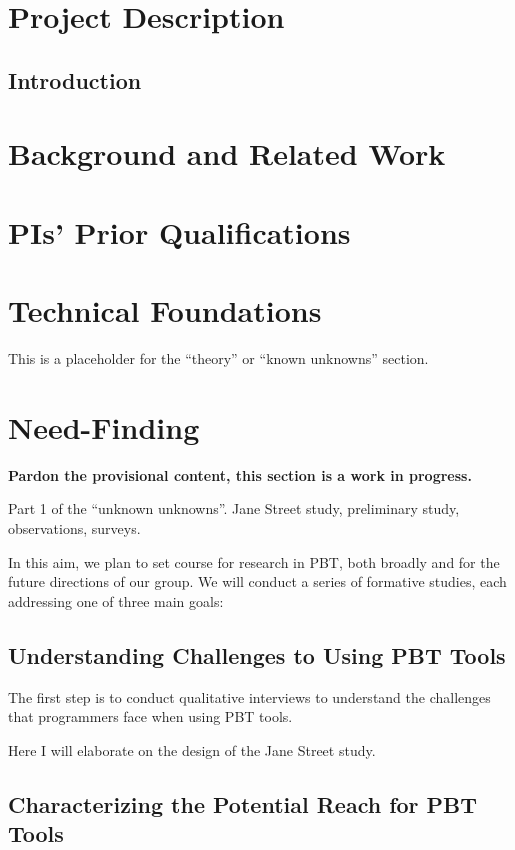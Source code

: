 \section{Project Description}
\subsection{Introduction}

\section{Background and Related Work}

\section{PIs' Prior Qualifications}

\section{Technical Foundations}

This is a placeholder for the ``theory'' or ``known unknowns'' section.

\section{Need-Finding}

\textbf{Pardon the provisional content, this section is a work in progress.}

Part 1 of the ``unknown unknowns''.
Jane Street study, preliminary study, observations, surveys.

In this aim, we plan to set course for research in PBT, both broadly and for the 
future directions of our group. We will conduct a series of formative studies, 
each addressing one of three main goals:

\subsection{Understanding Challenges to Using PBT Tools}

The first step is to conduct qualitative interviews to understand the challenges 
that programmers face when using PBT tools.

Here I will elaborate on the design of the Jane Street study.

\subsection{Characterizing the Potential Reach for PBT Tools}

